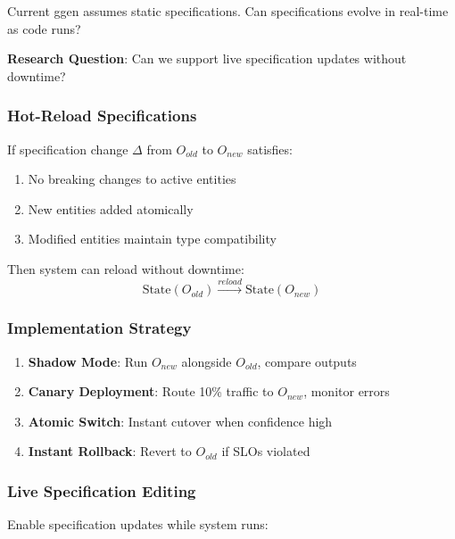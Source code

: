 Current ggen assumes static specifications. Can specifications evolve in real-time as code runs?

\textbf{Research Question}: Can we support live specification updates without downtime?

\subsubsection{Hot-Reload Specifications}

\begin{theorem}
    If specification change $\Delta$ from $O_{old}$ to $O_{new}$ satisfies:
    \begin{enumerate}
        \item No breaking changes to active entities
        \item New entities added atomically
        \item Modified entities maintain type compatibility
    \end{enumerate}
    Then system can reload without downtime:
    \begin{equation}
        \text{State}(O_{old}) \xrightarrow{reload} \text{State}(O_{new})
    \end{equation}
\end{theorem}

\subsubsection{Implementation Strategy}

\begin{enumerate}
    \item \textbf{Shadow Mode}: Run $O_{new}$ alongside $O_{old}$, compare outputs
    \item \textbf{Canary Deployment}: Route 10\% traffic to $O_{new}$, monitor errors
    \item \textbf{Atomic Switch}: Instant cutover when confidence high
    \item \textbf{Instant Rollback}: Revert to $O_{old}$ if SLOs violated
\end{enumerate}

\subsubsection{Live Specification Editing}

Enable specification updates while system runs:

